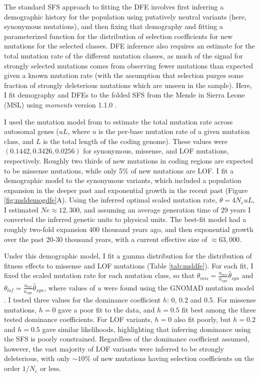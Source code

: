 \documentclass[]{article}
\begin{document}
The standard SFS approach to fitting the DFE involves first inferring a
demographic history for the population using putatively neutral variants (here,
synonymous mutations), and then fixing that demography and fitting a
parameterized function for the distribution of selection coefficients for new
mutations for the selected classes. DFE inference also requires an estimate for
the total mutation rate of the different mutation classes, as much of the
signal for strongly selected mutations comes from observing fewer mutations
than expected given a known mutation rate (with the assumption that selection
purges some fraction of strongly deleterious mutations which are unseen in the
sample). Here, I fit demography and DFEs to the folded SFS from the Mende in
Sierra Leone (MSL) using \emph{moments} version 1.1.0 \citep{Jouganous2017-pq}.

I used the mutation model from \citet{Karczewski2020-le} to estimate the total
mutation rate across autosomal genes (\(uL\), where \(u\) is the per-base mutation
rate of a given mutation class, and \(L\) is the total length of the coding
genome). These values were \((0.1442, 0.3426, 0.0256)\) for synonymous, missense,
and LOF mutations, respectively. Roughly two thirds of new mutations in coding
regions are expected to be missense mutations, while only 5\% of new mutations
are LOF. I fit a demographic model to the synonymous variants, which included a
population expansion in the deeper past and exponential growth in the recent
past (Figure \ref{fig:msldemogdfe}A). Using the inferred optimal scaled mutation
rate, \(\theta=4N_euL\), I estimated \(Ne\approx12,300\), and assuming an average
generation time of 29 years I converted the inferred genetic units to physical
units. The best-fit model had a roughly two-fold expansion 400 thousand years
ago, and then exponential growth over the past 20-30 thousand years, with a
current effective size of \(\approx 63,000\).

Under this demographic model, I fit a gamma distribution for the distribution
of fitness effects to missense and LOF mutations (Table \ref{tab:msldfe}). For
each fit, I fixed the scaled mutation rate for each mutation class, so that
\(\theta_{mis} = \frac{u_{mis}}{u_{syn}} \hat\theta_{syn}\) and \(\theta_{lof} = \frac{u_{lof}}{u_{syn}} \hat\theta_{syn}\), where values of \(u\) were found using
the GNOMAD mutation model \citep{Karczewski2020-le}. I tested three values for the
dominance coefficient \(h\): \(0\), \(0.2\) and \(0.5\). For missense mutations, \(h=0\)
gave a poor fit to the data, and \(h=0.5\) fit best among the three tested
dominance coefficients. For LOF variants, \(h=0\) also fit poorly, but \(h=0.2\)
and \(h=0.5\) gave similar likelihoods, highlighting that inferring dominance
using the SFS is poorly constrained. Regardless of the dominance coefficient
assumed, however, the vast majority of LOF variants were inferred to be
strongly deleterious, with only \(\sim10\%\) of new mutations having selection
coefficients on the order \(1/N_e\) or less.
\end{document}
